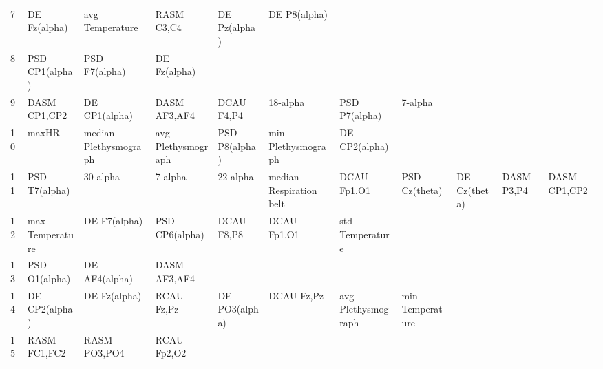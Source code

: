 \begin{landscape}
\begin{table}[]
\begin{tabular}{l|llllllll}
7        & DE Fz(alpha)          & avg Temperature       & RASM C3,C4           & DE Pz(alpha)            & DE P8(alpha)            &                      &                      &                       &                       &                    \\
8        & PSD CP1(alpha)        & PSD F7(alpha)         & DE Fz(alpha)         &                         &                         &                      &                      &                       &                       &                    \\
9        & DASM CP1,CP2          & DE CP1(alpha)         & DASM AF3,AF4         & DCAU F4,P4              & 18-alpha                & PSD P7(alpha)        & 7-alpha              &                       &                       &                    \\
10       & maxHR                 & median Plethysmograph & avg Plethysmograph   & PSD P8(alpha)           & min Plethysmograph      & DE CP2(alpha)        &                      &                       &                       &                    \\
11       & PSD T7(alpha)         & 30-alpha              & 7-alpha              & 22-alpha                & median Respiration belt & DCAU Fp1,O1          & PSD Cz(theta)        & DE Cz(theta)          & DASM P3,P4            & DASM CP1,CP2       \\
12       & max Temperature       & DE F7(alpha)          & PSD CP6(alpha)       & DCAU F8,P8              & DCAU Fp1,O1             & std Temperature      &                      &                       &                       &                    \\
13       & PSD O1(alpha)         & DE AF4(alpha)         & DASM AF3,AF4         &                         &                         &                      &                      &                       &                       &                    \\
14       & DE CP2(alpha)         & DE Fz(alpha)          & RCAU Fz,Pz           & DE PO3(alpha)           & DCAU Fz,Pz              & avg Plethysmograph   & min Temperature      &                       &                       &                    \\
15       & RASM FC1,FC2          & RASM PO3,PO4          & RCAU Fp2,O2          &                         &                         &                      &                      &                       &                       &                    \\

\end{tabular}
\end{table}
\end{landscape}
